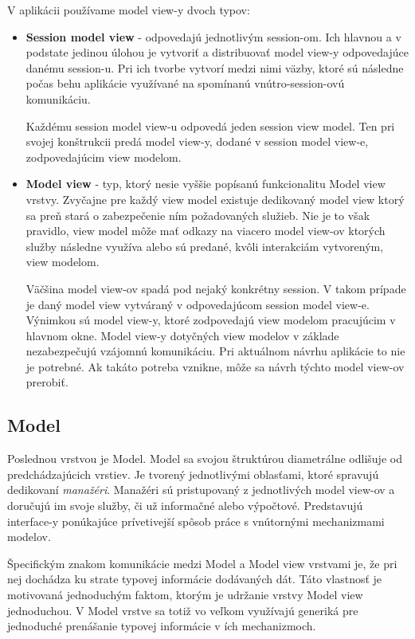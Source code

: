 V aplikácii používame model view-y dvoch typov:
\begin{itemize}
    \item \textbf{Session model view} - odpovedajú jednotlivým session-om. Ich hlavnou a v podstate jedinou úlohou je vytvoriť a distribuovať model view-y odpovedajúce danému session-u. Pri ich tvorbe vytvorí medzi nimi väzby, ktoré sú následne počas behu aplikácie využívané na spomínanú vnútro-session-ovú komunikáciu. 
    
    Každému session model view-u odpovedá jeden session view model. Ten pri svojej konštrukcii predá model view-y, dodané v session model view-e, zodpovedajúcim view modelom.   
    \item \textbf{Model view} - typ, ktorý nesie vyššie popísanú funkcionalitu Model view vrstvy. Zvyčajne pre každý view model existuje dedikovaný model view ktorý sa preň stará o zabezpečenie ním požadovaných služieb. Nie je to však pravidlo, view model môže mať odkazy na viacero model view-ov ktorých služby následne využíva alebo sú predané, kvôli interakciám vytvoreným, view modelom.

    Väčšina model view-ov spadá pod nejaký konkrétny session. V takom prípade je daný model view vytváraný v odpovedajúcom session model view-e. Výnimkou sú model view-y, ktoré zodpovedajú view modelom pracujúcim v hlavnom okne. Model view-y dotyčných view modelov v základe nezabezpečujú vzájomnú komunikáciu. Pri aktuálnom návrhu aplikácie to nie je potrebné. Ak takáto potreba vznikne, môže sa návrh týchto model view-ov prerobiť.  
\end{itemize}

\subsection{Model}

Poslednou  vrstvou je Model. Model sa svojou štruktúrou diametrálne odlišuje od predchádzajúcich vrstiev. Je tvorený jednotlivými oblasťami, ktoré spravujú dedikovaní \textit{manažéri}. Manažéri sú pristupovaný z jednotlivých model view-ov a doručujú im svoje služby, či už informačné alebo výpočtové. Predstavujú interface-y ponúkajúce prívetivejší spôsob práce s vnútornými mechanizmami modelov.

Špecifickým znakom komunikácie medzi Model a Model view vrstvami je, že pri nej dochádza ku strate typovej informácie dodávaných dát. Táto vlastnosť je motivovaná jednoduchým faktom, ktorým je udržanie vrstvy Model view jednoduchou. V Model vrstve sa totiž vo veľkom využívajú generiká pre jednoduché prenášanie typovej informácie v ích mechanizmoch. 

